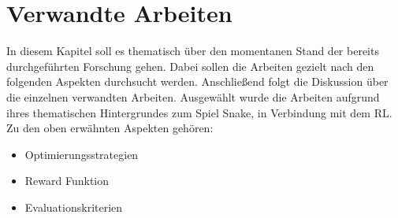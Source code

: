 \chapter{Verwandte Arbeiten} \label{chap:Verwandte_Arbeiten}
In diesem Kapitel soll es thematisch über den momentanen Stand der bereits durchgeführten Forschung gehen. Dabei sollen die Arbeiten gezielt nach den folgenden Aspekten durchsucht werden. Anschließend folgt die Diskussion über die einzelnen verwandten Arbeiten. 
Ausgewählt wurde die Arbeiten aufgrund ihres thematischen Hintergrundes zum Spiel Snake, in Verbindung mit dem RL.
Zu den oben erwähnten Aspekten gehören:
\begin{itemize}
	\item Optimierungsstrategien
	\item Reward Funktion
	\item Evaluationskriterien
\end{itemize}

